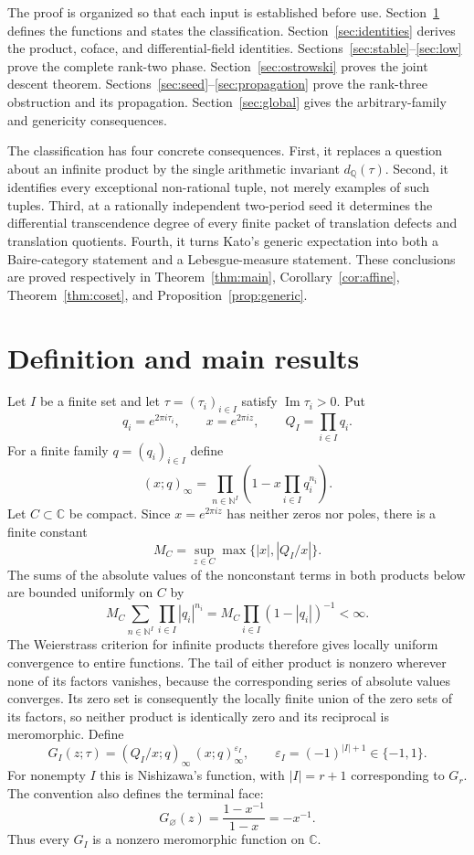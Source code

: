 \documentclass[11pt]{article}
\numberwithin{equation}{section}
\theoremstyle{definition}
\theoremstyle{remark}
\newcommand{\C}{\mathbb C}
\newcommand{\Q}{\mathbb Q}
\newcommand{\N}{\mathbb N}
\begin{document}
The proof is organized so that each input is established before use.
Section~\ref{sec:definitions} defines the functions and states the
classification.  Section~\ref{sec:identities} derives the product, coface,
and differential-field identities.  Sections~\ref{sec:stable}--\ref{sec:low}
prove the complete rank-two phase.  Section~\ref{sec:ostrowski} proves the
joint descent theorem.  Sections~\ref{sec:seed}--\ref{sec:propagation} prove
the rank-three obstruction and its propagation.  Section~\ref{sec:global}
gives the arbitrary-family and genericity consequences.

The classification has four concrete consequences.  First, it replaces a
question about an infinite product by the single arithmetic invariant
$d_\Q(\tau)$.  Second, it identifies every exceptional non-rational tuple,
not merely examples of such tuples.  Third, at a rationally independent
two-period seed it determines the differential transcendence degree of every
finite packet of translation defects and translation quotients.  Fourth, it
turns Kato's generic expectation into both a Baire-category statement and a
Lebesgue-measure statement.  These conclusions are proved respectively in
Theorem~\ref{thm:main}, Corollary~\ref{cor:affine},
Theorem~\ref{thm:coset}, and Proposition~\ref{prop:generic}.

\section{Definition and main results}
\label{sec:definitions}

Let $I$ be a finite set and let $\tau=(\tau_i)_{i\in I}$ satisfy
$\operatorname{Im}\tau_i>0$.  Put
\[
 q_i=e^{2\pi i\tau_i},\qquad x=e^{2\pi iz},\qquad
 Q_I=\prod_{i\in I}q_i.
\]
For a finite family $q=(q_i)_{i\in I}$ define
\[
 (x;q)_\infty=
 \prod_{n\in\N^I}\left(1-x\prod_{i\in I}q_i^{n_i}\right).
\]
Let $C\subset\C$ be compact.  Since $x=e^{2\pi iz}$ has neither zeros nor
poles, there is a finite constant
\[
 M_C=\sup_{z\in C}\max\{|x|,|Q_I/x|\}.
\]
The sums of the absolute values of the nonconstant terms in both products
below are bounded uniformly on $C$ by
\[
 M_C\sum_{n\in\N^I}\prod_{i\in I}|q_i|^{n_i}
 =M_C\prod_{i\in I}(1-|q_i|)^{-1}<\infty.
\]
The Weierstrass criterion for infinite products therefore gives locally
uniform convergence to entire functions.  The tail of either product is
nonzero wherever none of its factors vanishes, because the corresponding
series of absolute values converges.  Its zero set is consequently the
locally finite union of the zero sets of its factors, so neither product is
identically zero and its reciprocal is meromorphic.  Define
\begin{equation}
 G_I(z;\tau)=
 (Q_I/x;q)_\infty\,(x;q)_\infty^{\varepsilon_I},
 \qquad \varepsilon_I=(-1)^{|I|+1}\in\{-1,1\}.
 \label{eq:defG}
\end{equation}
For nonempty $I$ this is Nishizawa's function, with $|I|=r+1$
corresponding to $G_r$.  The convention also defines the terminal face:
\begin{equation}
 G_\varnothing(z)=\frac{1-x^{-1}}{1-x}=-x^{-1}.
 \label{eq:terminal-G}
\end{equation}
Thus every $G_I$ is a nonzero meromorphic function on $\C$.
\end{document}
